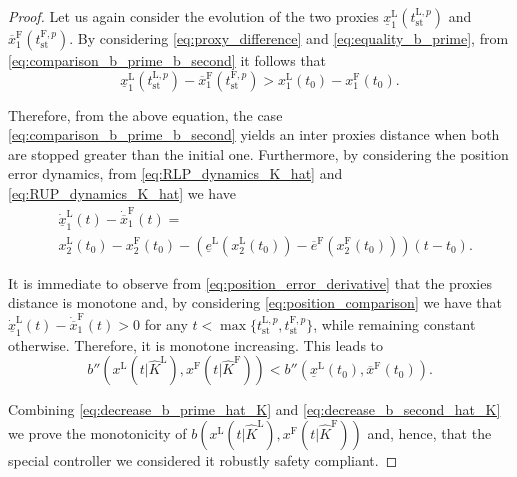 \documentclass[letterpaper, 10 pt, conference]{ieeeconf}
\theoremstyle{definition}
\theoremstyle{nopoint}
\begin{document}
\begin{proof}
	Let us again consider the evolution of the two proxies $\underline{x}_1^\mathrm{L}(t_{\mathrm{st}}^{\mathrm{L},p} )$ and $\overline{x}_1^\mathrm{F}(t_{\mathrm{st}}^{\mathrm{F},p} )$. 
	By considering \eqref{eq:proxy_difference} and \eqref{eq:equality_b_prime}, from \eqref{eq:comparison_b_prime_b_second} it follows that  
	\begin{equation}\label{eq:position_comparison}
		\underline{x}_1^\mathrm{L}(t_{\mathrm{st}}^{\mathrm{L},p} ) -\overline{x}_1^\mathrm{F}(t_{\mathrm{st}}^{\mathrm{F},p}  )>
		x_1^\mathrm{L}(t_0)-x_1^\mathrm{F}(t_0).
	\end{equation}
	
	Therefore, from the above equation, the case \eqref{eq:comparison_b_prime_b_second} yields an inter proxies distance when both are stopped greater than the initial one.  
	Furthermore, by considering the position error dynamics, from \eqref{eq:RLP_dynamics_K_hat} and \eqref{eq:RUP_dynamics_K_hat} we have 
	\begin{align}\label{eq:position_error_derivative}
		&\dot{\underline{x}}_1^\mathrm{L}(t)-\dot{\overline{x}}_1^\mathrm{F}(t)= \nonumber \\
		& x_2^\mathrm{L}(t_0)-x_2^\mathrm{F}(t_0)-
		\left(
		\underline{e}^\mathrm{L}\left(x_2^\mathrm{L}(t_0)\right)-
		\overline{e}^\mathrm{F}\left(x_2^\mathrm{F}(t_0)\right)
		\right)(t-t_0).
	\end{align}
	

	
	
	It is immediate to observe from \eqref{eq:position_error_derivative} that the proxies distance is monotone and, by considering \eqref{eq:position_comparison} we have that $\dot{\underline{x}}_1^\mathrm{L}(t)-\dot{\overline{x}}_1^\mathrm{F}(t)>0$ for any $t< \max\{t_{\mathrm{st}}^{\mathrm{L},p},t_{\mathrm{st}}^{\mathrm{F},p} \}$, while remaining constant otherwise. Therefore, it is monotone increasing. This leads  to 
	\begin{equation}\label{eq:decrease_b_second_hat_K}
		b''(x^\mathrm{L}(t | \hat{K}^\mathrm{L}),x^\mathrm{F}(t | \hat{K}^\mathrm{F}))< b''(\underline{x}^\mathrm{L}(t_0),\overline{x}^\mathrm{F}(t_0)). 
	\end{equation}
	
	Combining \eqref{eq:decrease_b_prime_hat_K} and \eqref{eq:decrease_b_second_hat_K} we prove the  monotonicity of $b(x^\mathrm{L}(t | \hat{K}^\mathrm{L}),x^\mathrm{F}(t | \hat{K}^\mathrm{F}))$ and, hence, that the special controller we considered it robustly safety compliant. 
	

\end{proof}
\end{document}

